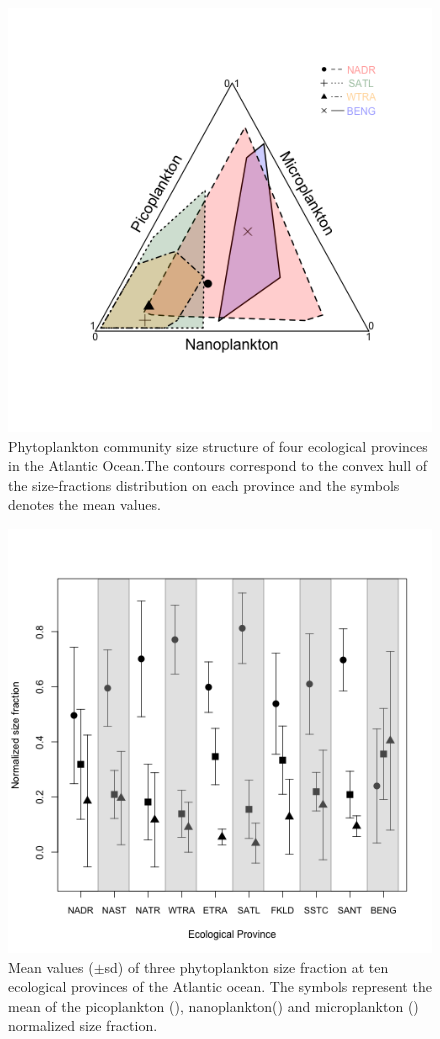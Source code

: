 \begin{figure}
\centering
\includegraphics[trim = 15mm 15mm 15mm 15mm, clip, width=0.5\linewidth]{./Chp2-Pre/amt_4RegionsTriSizeFrac4.png}
\caption[Scheme]{\small {Phytoplankton community size structure of four ecological provinces in the Atlantic Ocean.The contours correspond to the convex hull of the size-fractions distribution on each province and the symbols denotes the mean values.}}
\label{RegSizeFrac}
\end{figure}

\begin{figure}
\centering
\includegraphics[trim = 0mm 0mm 0mm 0mm, clip, width=0.5\linewidth]{./Chp2-Pre/amt_MeanSDProvinces.png}
\caption[Scheme]{\small {Mean values ($\pm$sd) of three phytoplankton size fraction at ten ecological provinces of the Atlantic ocean. The symbols represent the mean of the picoplankton (), nanoplankton() and microplankton () normalized size fraction.}}
\label{means}
\end{figure}

